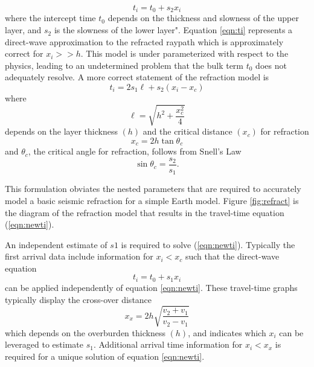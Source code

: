 \documentclass{article}
\begin{document}
\begin{equation}
t_i = t_0 + s_2x_i
\label{eqn:ti}
\end{equation}
where the intercept time $t_0$ depends on the thickness and slowness of the upper layer, and $s_2$ is the slowness of the lower layer". Equation \ref{eqn:ti} represents a direct-wave approximation to the refracted raypath which is approximately correct for $x_i >> h$. This model is under parameterized with respect to the physics, leading to an undetermined problem that the bulk term $t_0$ does not adequately resolve. A more correct statement of the refraction model is
\begin{equation}
t_i = 2s_1\ell+ s_2(x_i-x_c)
\label{eqn:newti}
\end{equation}
where 
\begin{equation}
    \ell = \sqrt{h^2 + \frac{x_c^2}{4}}
\end{equation}
depends on the layer thickness $(h)$ and the critical distance $(x_c)$ for refraction 
\begin{equation}
    x_c = 2h \operatorname{tan}\theta _c
\end{equation}
and $\theta _c$, the critical angle for refraction, follows from Snell's Law
\begin{equation}
    \operatorname{sin}\theta_c = \frac{s_2}{s_1}.
\end{equation}

This formulation obviates the nested parameters that are required to accurately model a basic seismic refraction for a simple Earth model. Figure \ref{fig:refract} is the diagram of the refraction model that results in the travel-time equation (\ref{eqn:newti}). 

An independent estimate of $s1$ is required to solve (\ref{eqn:newti}). Typically the first arrival data include information for $x_i < x_c$ such that the direct-wave equation 
\begin{equation}
t_i = t_0 + s_1x_i
\label{eqn:t1}
\end{equation}
can be applied independently of equation \ref{eqn:newti}. These travel-time graphs typically display the cross-over distance 
\begin{equation}
    x_x = 2 h \sqrt{\frac{v_{2}+v_{1}}{v_{2}-v_{1}}}
\end{equation}
which depends on the overburden thickness $(h)$, and indicates which $x_i$ can be leveraged to estimate $s_1$. Additional arrival time information for $x_i < x_x$ is required for a unique solution of equation \ref{eqn:newti}.
\end{document}
